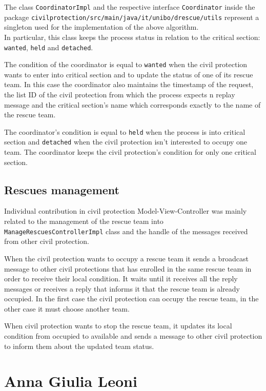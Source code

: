 \documentclass[a4paper,12pt]{report}
\begin{document}
The class \texttt{CoordinatorImpl} and the respective interface \texttt{Coordinator} inside the package \texttt{civilprotection/src/main/java/it/unibo/drescue/utils} represent a singleton used for the implementation of the above algorithm.\\
In particular, this class keeps the process status in relation to the critical section: \texttt{wanted}, \texttt{held} and \texttt{detached}.

The condition of the coordinator is equal to \texttt{wanted} when the civil protection wants to enter into critical section and to update the status of one of its rescue team. 
In this case the coordinator also maintains the timestamp of the request, the list ID of the civil protection from which the process expects n replay message and the critical section's name which corresponds exactly to the name of the rescue team.

The coordinator's condition is equal to \texttt{held} when the process is into critical section and \texttt{detached} when the civil protection isn't interested to occupy one team.
The coordinator keeps the civil protection's condition for only one critical section.\\

\subsection{Rescues management}
Individual contribution in civil protection Model-View-Controller was mainly related to the management of the rescue team into \texttt{ManageRescuesControllerImpl} class and the handle of the  messages received from other civil protection.

When the civil protection wants to occupy a rescue team it sends a broadcast message to other civil protections that has enrolled in the same rescue team in order to receive their local condition.
It waits until it receives all the reply messages or receives a reply that informs it that the rescue team is already occupied.
In the first case the civil protection can occupy the rescue team, in the other case it must choose another team.

When civil protection wants to stop the rescue team, it updates its local condition from occupied to available and sends a message to other civil protection to inform them about the updated team status.

\section{Anna Giulia Leoni}
\end{document}

